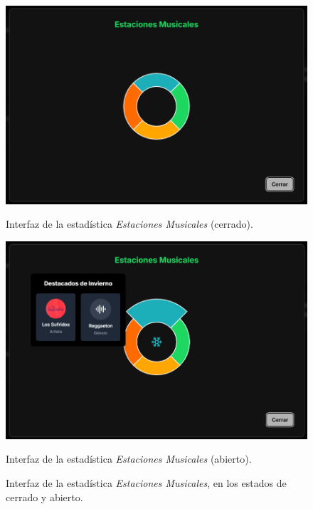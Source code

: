 \begin{figure}[H]
    \centering
    \vspace{-10pt}
    \begin{minipage}{0.47\textwidth}
        \centering
        \includegraphics[width=\textwidth]{figures/capturas_ui/estaciones_musicales_cerrado.png}
        \caption{Interfaz de la estadística \textit{Estaciones Musicales} (cerrado).}
        \label{fig:estaciones_musicales_cerrado}
    \end{minipage}
    \begin{minipage}{0.47\textwidth}
        \centering
        \includegraphics[width=\textwidth]{figures/capturas_ui/estaciones_musicales_abierto.png}
        \caption{Interfaz de la estadística \textit{Estaciones Musicales} (abierto).}
        \label{fig:estaciones_musicales_abierto}
    \end{minipage}
    \caption{Interfaz de la estadística \textit{Estaciones Musicales}, en los estados de cerrado y abierto.}
    \label{fig:estaciones_musicales}
\end{figure}

